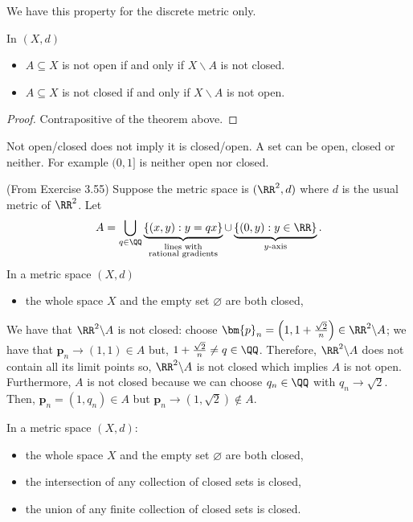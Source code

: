 \documentclass[12pt, a4paper]{article}
\begin{document}
\begin{mdremark}
    We have this property for the discrete metric only.
\end{mdremark}

\begin{mdcor}
    In \((X,d)\)
    \begin{itemize}
        \item \(A \subseteq X\) is not open if and only if \(X \backslash A\) is not closed.
        \item \(A \subseteq X\) is not closed if and only if \(X \backslash A\) is not open.
    \end{itemize}
\end{mdcor}

\begin{proof}
    Contrapositive of the theorem above.
\end{proof}

\begin{mdremark}
    Not open/closed does not imply it is closed/open. A set can be open, closed or neither. For example \((0,1]\) is neither open nor closed.
\end{mdremark}

\begin{mdexample}
    (From Exercise 3.55) Suppose the metric space is \((\RR^2,d)\) where \(d\) is the usual metric of \(\RR^2\). Let 
    \[A = \bigcup_{q \in \QQ} \underbrace{\{(x,y) : y =qx\}}_{\substack{\text{lines with} \\ \text{rational gradients}}} \cup \underbrace{\{(0,y): y \in \RR\}}_{y\text{-axis}}.\]
    In a metric space \((X,d)\)
    \begin{itemize}
        \item the whole space \(X\) and the empty set \(\varnothing\) are both closed,
    \end{itemize}
    We have that \(\RR^2 \backslash A\) is not closed: choose \(\bm{p}_n = \left( 1,1+\frac{\sqrt{2}}{n} \right) \in \RR^2 \backslash A\); we have that \(\bm{p}_n \to (1,1) \in A\) but, \(1+\frac{\sqrt{2}}{n} \neq q \in \QQ\). Therefore, \(\RR^2 \backslash A\) does not contain all its limit points so, \(\RR^2 \backslash A\) is not closed which implies \(A\) is not open. Furthermore, \(A\) is not closed because we can choose \(q_n \in \QQ\) with \(q_n \to \sqrt{2}\). Then, \(\bm{p}_n=(1,q_n) \in A\) but \(\bm{p}_n \to (1,\sqrt{2}) \not\in A\).
\end{mdexample}

\begin{mdthm}
    In a metric space \((X,d)\):
    \begin{itemize}
        \item the whole space \(X\) and the empty set \(\varnothing\) are both closed,
        \item the intersection of any collection of closed sets is closed,
        \item the union of any finite collection of closed sets is closed.
    \end{itemize}
\end{mdthm}
\end{document}
